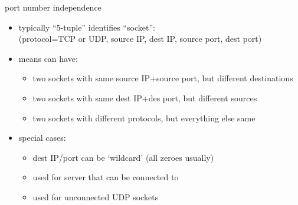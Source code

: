 \begin{frame}{port number independence}
    \begin{itemize}
    \item typically ``5-tuple'' identifies ``socket'': \\
        (protocol=TCP or UDP, source IP, dest IP, source port, dest port)
    \item means can have:
        \begin{itemize}
        \item two sockets with same source IP+source port, but different destinations
        \item two sockets with same dest IP+des port, but different sources
        \item two sockets with different protocols, but everything else same
        \end{itemize}
    \item special cases:
        \begin{itemize}
        \item dest IP/port can be `wildcard' (all zeroes usually)
        \item used for server that can be connected to
        \item used for unconnected UDP sockets
        \end{itemize}
    \end{itemize}
\end{frame}
